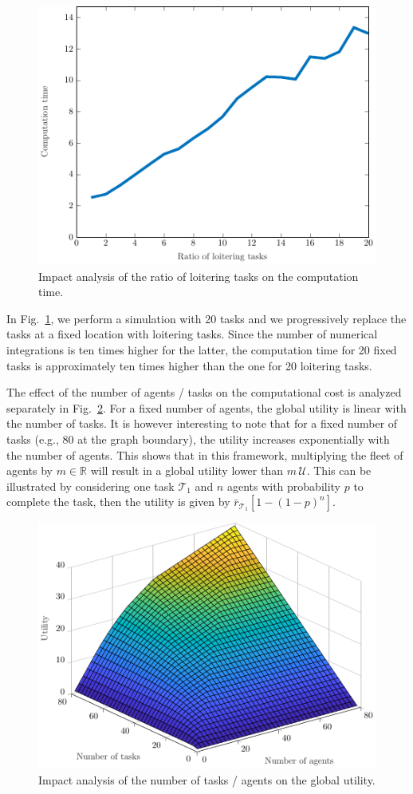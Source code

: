 \documentclass{ifacconf}
\newcommand{\cT}{\mathcal{T}}
\newcommand{\cU}{\mathcal{U}}
\begin{document}
\begin{figure}[h]
  \centering
  \includegraphics[width=0.8\linewidth]{Figures/ntLoiterComputationTime.pdf}
  \caption{Impact analysis of the ratio of loitering tasks on the computation time.}
  \label{fig:ntLoiterComputationTime}
\end{figure}

In Fig.~\ref{fig:ntLoiterComputationTime}, we perform a simulation with 20 tasks and we progressively replace the tasks at a fixed location with loitering tasks. Since the number of numerical integrations is ten times higher for the latter, the computation time for 20 fixed tasks is approximately ten times higher than the one for 20 loitering tasks.

The effect of the number of agents / tasks on the computational cost is analyzed separately in Fig.~\ref{fig:nTnAUtility}. For a fixed number of agents, the global utility is linear with the number of tasks. It is however interesting to note that for a fixed number of tasks (e.g., 80 at the graph boundary), the utility increases exponentially with the number of agents. This shows that in this framework, multiplying the fleet of agents by $m \in \mathbb{R}$ will result in a global utility lower than $m\,\cU$. This can be illustrated by considering one task $\cT_1$ and $n$ agents with probability $p$ to complete the task, then the utility is given by $\bar{r}_{\cT_1}[1-(1-p)^n]$. 

\begin{figure}[h]
  \centering
  \includegraphics[width=0.7\linewidth]{Figures/nTnAUtility.pdf}
  \caption{Impact analysis of the number of tasks / agents on the global utility.}
  \label{fig:nTnAUtility}
\end{figure}
\end{document}
